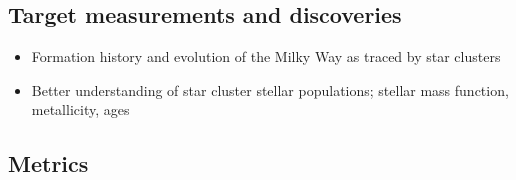 \subsection{Target measurements and discoveries}
\label{sec:keyword:targets}


\begin{itemize}

\item Formation history and evolution of the Milky Way as traced by star clusters

\item Better understanding of star cluster stellar populations; stellar mass function, metallicity, ages

\end{itemize}





\subsection{Metrics}
\label{sec:keyword:metrics}


